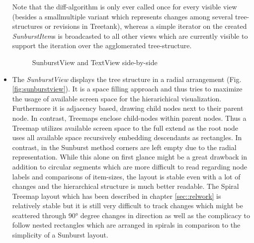 \begin{itemize}
Note that the diff-algorithm is only ever called once for every visible view (besides a smallmultiple variant which represents changes among several tree-structures or revisions in Treetank), whereas a simple iterator on the created \emph{SunburstItem}s is broadcasted to all other views which are currently visible to support the iteration over the agglomerated tree-structure.

\begin{figure}[tb]
\caption{\label{fig:sunbursttextview} SunburstView and TextView side-by-side}
\end{figure}

\item
The \emph{SunburstView} displays the tree structure in a radial arrangement (Fig. \ref{fig:sunburstview}). It is a space filling approach and thus tries to maximize the usage of available screen space for the hierarichical visualization. Furthermore it is adjacency based, drawing child nodes next to their parent node. In contrast, Treemaps enclose child-nodes within parent nodes. Thus a Treemap utilizes available screen space to the full extend as the root node uses all available space recursively embedding descendants as rectangles. In contrast, in the Sunburst method corners are left empty due to the radial representation. While this alone on first glance might be a great drawback in addition to circular segments which are more difficult to read regarding node labels and comparisons of item-sizes, the layout is stable even with a lot of changes and the hierarchical structure is much better readable. The Spiral Treemap layout which has been described in chapter \ref{sec::relwork} is relatively stable but it is still very difficult to track changes which might be scattered through 90° degree changes in direction as well as the complicacy to follow nested rectangles which are arranged in spirals in comparison to the simplicity of a Sunburst layout.


\end{itemize}
